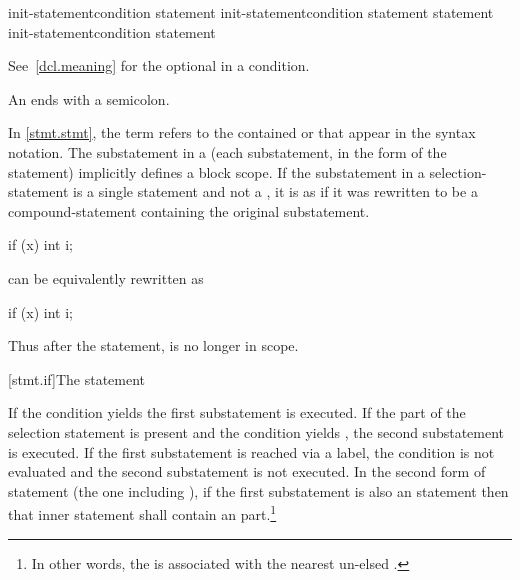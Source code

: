 %
%
%
\begin{bnf}
\br
     init-statement\opt condition \terminal{)} statement\br
     init-statement\opt condition \terminal{)} statement  statement\br
     init-statement\opt condition \terminal{)} statement
\end{bnf}

See~\ref{dcl.meaning} for the optional  in a condition.
\begin{note}
An  ends with a semicolon.
\end{note}
In \ref{stmt.stmt}, the term  refers to
the contained  or  that appear
in the syntax notation.
%
The substatement in a  (each substatement,
in the  form of the  statement) implicitly defines
a block scope. If the substatement in a
selection-statement is a single statement and not a
, it is as if it was rewritten to be a
compound-statement containing the original substatement.
\begin{example}

\begin{codeblock}
if (x)
  int i;
\end{codeblock}

can be equivalently rewritten as

\begin{codeblock}
if (x) {
  int i;
}
\end{codeblock}

Thus after the  statement,  is no longer in scope.
\end{example}

[stmt.if]{The  statement}%

\pnum
If the condition yields  the first
substatement is executed. If the  part of the selection
statement is present and the condition yields , the second
substatement is executed. If the first substatement is reached via a
label, the condition is not evaluated and the second substatement is
not executed. In the second form of  statement
(the one including ), if the first substatement is also an
 statement then that inner  statement shall contain
an  part.\footnote{In other words, the  is associated with the nearest un-elsed
.}

